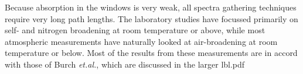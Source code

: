 \documentclass[11pt]{article}
\begin{document}
Because absorption in the windows is very weak, all spectra gathering 
techniques require very long path lengths.  The laboratory studies have 
focussed primarily on self- and nitrogen broadening at room temperature or 
above, while most atmospheric measurements have naturally looked at 
air-broadening at room temperature or below.  Most of the results from 
these measurements are in accord with
those of Burch {\it et.al.}, which are discussed in the larger lbl.pdf
\newpage



%

\end{document}
